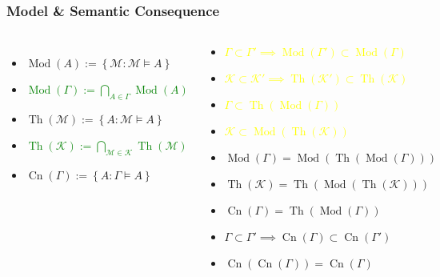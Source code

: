 \documentclass[UTF8,aspectratio=43,11pt,colorlinks,compress,openany]{beamer}%
\begin{document}
\begin{frame}\frametitle{Model \& Semantic Consequence}
\begin{columns}
	\begin{itemize}
		\item $\operatorname{Mod}(A):=\left\{\mathcal{M}: \mathcal{M}\vDash A\right\}$
		\item \textcolor{green}{$\operatorname{Mod}(\Gamma):=\bigcap\limits_{A\in\Gamma}\operatorname{Mod}(A)$}
		\item $\operatorname{Th}(\mathcal{M}):=\left\{A: \mathcal{M}\vDash A\right\}$
		\item \textcolor{green}{$\operatorname{Th}(\mathcal{K}):=\bigcap\limits_{\mathcal{M}\in\mathcal{K}}\operatorname{Th}(\mathcal{M})$}
		\item $\operatorname{Cn}(\Gamma):=\left\{A: \Gamma\vDash A\right\}$
	\end{itemize}
	\begin{block}{}
		\begin{itemize}
			\item \textcolor{yellow}{$\Gamma\subset\Gamma'\implies\operatorname{Mod}(\Gamma')\subset\operatorname{Mod}(\Gamma)$}
			\item \textcolor{yellow}{$\mathcal{K}\subset\mathcal{K}'\implies\operatorname{Th}(\mathcal{K}')\subset\operatorname{Th}(\mathcal{K})$}
			\item \textcolor{yellow}{$\Gamma\subset\operatorname{Th}(\operatorname{Mod}(\Gamma))$}
			\item \textcolor{yellow}{$\mathcal{K}\subset\operatorname{Mod}(\operatorname{Th}(\mathcal{K}))$}
			\item $\operatorname{Mod}(\Gamma)=\operatorname{Mod}(\operatorname{Th}(\operatorname{Mod}(\Gamma)))$
			\item $\operatorname{Th}(\mathcal{K})=\operatorname{Th}(\operatorname{Mod}(\operatorname{Th}(\mathcal{K})))$
			\item $\operatorname{Cn}(\Gamma)=\operatorname{Th}(\operatorname{Mod}(\Gamma))$
			\item $\Gamma\subset\Gamma'\implies \operatorname{Cn}(\Gamma)\subset \operatorname{Cn}(\Gamma')$
			\item $\operatorname{Cn}(\operatorname{Cn}(\Gamma))=\operatorname{Cn}(\Gamma)$
		\end{itemize}
	\end{block}
\end{columns}
\end{frame}
\end{document}
